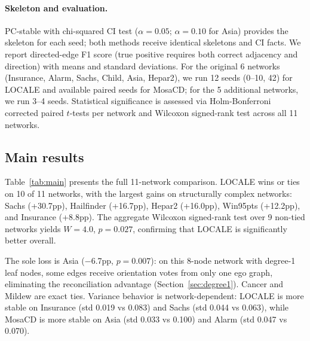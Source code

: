 \documentclass{article}
\begin{document}
\paragraph{Skeleton and evaluation.} PC-stable \citep{colombo2014order} with chi-squared CI test ($\alpha{=}0.05$; $\alpha{=}0.10$ for Asia) provides the skeleton for each seed; both methods receive identical skeletons and CI facts. We report directed-edge F1 score (true positive requires both correct adjacency and direction) with means and standard deviations. For the original 6 networks (Insurance, Alarm, Sachs, Child, Asia, Hepar2), we run 12 seeds (0--10, 42) for LOCALE and available paired seeds for MosaCD; for the 5 additional networks, we run 3--4 seeds. Statistical significance is assessed via Holm-Bonferroni corrected paired $t$-tests per network and Wilcoxon signed-rank test across all 11 networks.

\subsection{Main results}

Table~\ref{tab:main} presents the full 11-network comparison. LOCALE wins or ties on 10 of 11 networks, with the largest gains on structurally complex networks: Sachs (+30.7pp), Hailfinder (+16.7pp), Hepar2 (+16.0pp), Win95pts (+12.2pp), and Insurance (+8.8pp). The aggregate Wilcoxon signed-rank test over 9 non-tied networks yields $W{=}4.0$, $p{=}0.027$, confirming that LOCALE is significantly better overall.

The sole loss is Asia ($-$6.7pp, $p{=}0.007$): on this 8-node network with degree-1 leaf nodes, some edges receive orientation votes from only one ego graph, eliminating the reconciliation advantage (Section~\ref{sec:degree1}). Cancer and Mildew are exact ties. Variance behavior is network-dependent: LOCALE is more stable on Insurance (std 0.019 vs 0.083) and Sachs (std 0.044 vs 0.063), while MosaCD is more stable on Asia (std 0.033 vs 0.100) and Alarm (std 0.047 vs 0.070).
\end{document}

